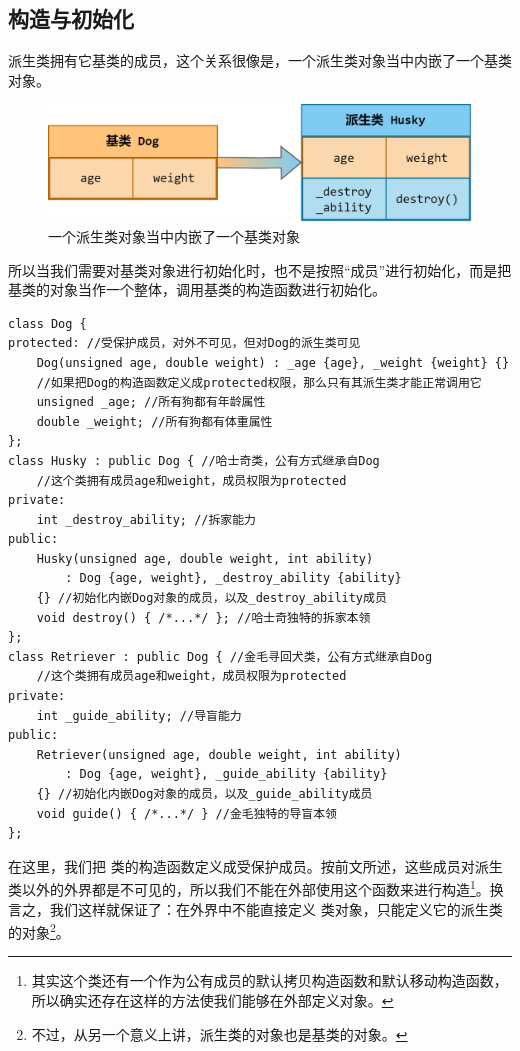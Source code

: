 \subsection*{构造与初始化}
派生类拥有它基类的成员，这个关系很像是，一个派生类对象当中内嵌了一个基类对象。
\begin{figure}[htbp]
    \centering
    \includegraphics[width=.8\textwidth]{images/generalized_parts/09_built_in_base_class_object_in_derived_class_300.png}
    \caption{一个派生类对象当中内嵌了一个基类对象}
\end{figure}
所以当我们需要对基类对象进行初始化时，也不是按照``成员''进行初始化，而是把基类的对象当作一个整体，调用基类的构造函数进行初始化。\par
\begin{lstlisting}
class Dog {
protected: //受保护成员，对外不可见，但对Dog的派生类可见
    Dog(unsigned age, double weight) : _age {age}, _weight {weight} {}
    //如果把Dog的构造函数定义成protected权限，那么只有其派生类才能正常调用它
    unsigned _age; //所有狗都有年龄属性
    double _weight; //所有狗都有体重属性
};
class Husky : public Dog { //哈士奇类，公有方式继承自Dog
    //这个类拥有成员age和weight，成员权限为protected
private:
    int _destroy_ability; //拆家能力
public:
    Husky(unsigned age, double weight, int ability)
        : Dog {age, weight}, _destroy_ability {ability}
    {} //初始化内嵌Dog对象的成员，以及_destroy_ability成员
    void destroy() { /*...*/ }; //哈士奇独特的拆家本领
};
class Retriever : public Dog { //金毛寻回犬类，公有方式继承自Dog
    //这个类拥有成员age和weight，成员权限为protected
private:
    int _guide_ability; //导盲能力
public:
    Retriever(unsigned age, double weight, int ability)
        : Dog {age, weight}, _guide_ability {ability}
    {} //初始化内嵌Dog对象的成员，以及_guide_ability成员
    void guide() { /*...*/ } //金毛独特的导盲本领
};
\end{lstlisting}\par
在这里，我们把 \lstinline@Dog@ 类的构造函数定义成受保护成员。按前文所述，这些成员对派生类以外的外界都是不可见的，所以我们不能在外部使用这个函数来进行构造\footnote{其实这个类还有一个作为公有成员的默认拷贝构造函数和默认移动构造函数，所以确实还存在这样的方法使我们能够在外部定义对象。}。换言之，我们这样就保证了：在外界中不能直接定义 \lstinline@Dog@ 类对象，只能定义它的派生类的对象\footnote{不过，从另一个意义上讲，派生类的对象也是基类的对象。}。\par
